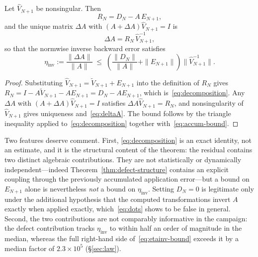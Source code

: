 \documentclass[review,onefignum,onetabnum]{siamart251216}
\begin{document}
\begin{theorem}\label{thm:backward}
Let $\widehat V_{N+1}$ be nonsingular. Then
%
\begin{equation}\label{eq:decomposition}
R_N = D_N - A\,E_{N+1},
\end{equation}
%
and the unique matrix $\Delta A$ with $(A+\Delta A)\widehat V_{N+1}=I$ is
%
\begin{equation}\label{eq:deltaA}
\Delta A = R_N\,\widehat V_{N+1}^{-1},
\end{equation}
%
so that the normwise inverse backward error satisfies
%
\begin{equation}\label{eq:etainv-bound}
\eta_{\mathrm{inv}} := \frac{\|\Delta A\|}{\|A\|}
\;\le\;
\left(\frac{\|D_N\|}{\|A\|} + \|E_{N+1}\|\right)\bigl\|\widehat V_{N+1}^{-1}\bigr\| .
\end{equation}
\end{theorem}

\begin{proof}
Substituting $\widehat V_{N+1}=\widetilde V_{N+1}+E_{N+1}$ into the definition of $R_N$
gives $R_N = I-A\widetilde V_{N+1}-AE_{N+1} = D_N - AE_{N+1}$, which
is~\eqref{eq:decomposition}. Any $\Delta A$ with $(A+\Delta A)\widehat V_{N+1}=I$ satisfies
$\Delta A\widehat V_{N+1}=R_N$, and nonsingularity of $\widehat V_{N+1}$ gives uniqueness
and~\eqref{eq:deltaA}. The bound follows by the triangle inequality applied
to~\eqref{eq:decomposition} together with~\eqref{eq:accum-bound}.
\end{proof}

Two features deserve comment. First, \eqref{eq:decomposition} is an exact identity, not an
estimate, and it is the structural content of the theorem: the residual contains two distinct
algebraic contributions. They are not statistically or dynamically independent---indeed
Theorem~\ref{thm:defect-structure} contains an explicit coupling through the previously accumulated
application error---but a bound on $E_{N+1}$ alone is nevertheless \emph{not} a bound on
$\eta_{\mathrm{inv}}$. Setting $D_N=0$ is legitimate only under the additional hypothesis that
the computed transformations invert $A$ exactly when applied exactly, which~\eqref{eq:dots}
shows to be false in general. Second, the two contributions are not comparably informative in the
campaign: the defect contribution tracks $\eta_{\mathrm{inv}}$ to within half an order of magnitude
in the median, whereas the full right-hand side of~\eqref{eq:etainv-bound} exceeds it by a median
factor of $2.3\times10^{5}$ (\S\ref{sec:law}).
\end{document}
